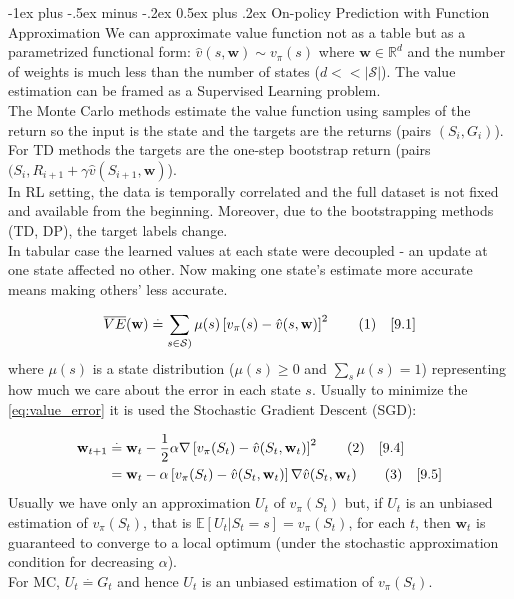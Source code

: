 \documentclass[10pt,landscape]{article}
\makeatletter
\renewcommand{\section}{\@startsection{section}{1}{0mm}%
                                {-1ex plus -.5ex minus -.2ex}%
                                {0.5ex plus .2ex}%
                                {\normalfont\large\bfseries}}
\newcommand\numberthis{\addtocounter{equation}{1}\tag{\theequation}}
\makeatother
\begin{document}
\begin{multicols}{3}
\section{On-policy Prediction with Function Approximation}
We can approximate value function not as a table but as a parametrized functional form: $\hat{v}(s,\mathbf{w}) \sim v_{\pi}(s)$ where $\mathbf{w} \in \mathbb{R}^d$ and the number of weights is much less than the number of states ($d << |\mathcal{S}|$).
The value estimation can be framed as a Supervised Learning problem.\\
The Monte Carlo methods estimate the value function using samples of the return so the input is the state and the targets are the returns (pairs $(S_i, G_i)$). \\
For TD methods the targets are the one-step bootstrap return (pairs $(S_i, R_{i+1} + \gamma \hat{v}(S_{i+1}, \mathbf{w})$).\\
In RL setting, the data is temporally correlated and the full dataset is not fixed and available from the beginning. Moreover, due to the bootstrapping methods (TD, DP), the target labels change.\\
In tabular case the learned values at each state were decoupled -  an update at one state affected no other.
Now making one state's estimate more accurate means making others' less accurate.

\begin{equation}
    \overline{VE}(\mathbf{w})  \stackrel{.}{=} \sum_{s \in \mathcal{S})} \mu(s) \left [ v_{\pi}(s) - \hat{v}(s, \mathbf{w}) \right ]^2 \label{eq:value_error} \numberthis \quad [9.1]  
\end{equation}
where $\mu(s)$ is a state distribution ($\mu(s) \ge 0$ and $\sum_s \mu(s) = 1$) representing how much we care about the error in each state $s$.
Usually to minimize the \ref{eq:value_error} it is used the Stochastic Gradient Descent (SGD):

\begin{align*}
    \mathbf{w}_{t+1} & \stackrel{.}{=} \mathbf{w}_{t} - \frac{1}{2} \alpha \nabla \left [ v_{\pi}(S_t) - \hat{v}(S_t, \mathbf{w}_t) \right ]^2 \numberthis \quad [9.4]\\
& = \mathbf{w}_{t} - \alpha \left [ v_{\pi}(S_t) - \hat{v}(S_t, \mathbf{w}_t) \right ] \nabla \hat{v}(S_t, \mathbf{w}_t) \numberthis \quad [9.5]
\end{align*}
Usually we have only an approximation $U_t$ of $v_{\pi}(S_t)$ but, if $U_t$ is an unbiased estimation of $v_{\pi}(S_t)$, that is $\mathbb{E}[U_t|S_t=s] = v_{\pi}(S_t)$, for each $t$, then $\mathbf{w}_t$ is guaranteed to converge to a local optimum (under the stochastic approximation condition for decreasing $\alpha$). \\
For MC, $U_t \stackrel{.}{=} G_t$ and hence $U_t$ is an unbiased estimation of $v_{\pi}(S_t)$.


\end{multicols}
\end{document}
